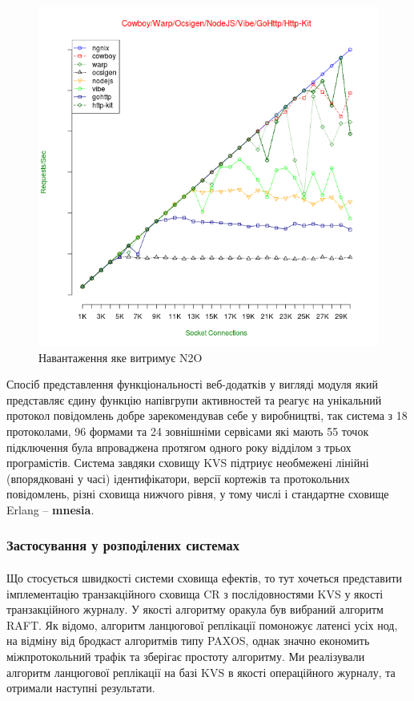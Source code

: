 \documentclass[11pt,oneside]{article}
\begin{document}
\begin{figure}[h!]
\centering
\includegraphics[scale=0.5]{img/connections}
\caption{Навантаження яке витримує N2O}
\end{figure}

Спосіб представлення функціональності веб-додатків у вигляді модуля який
представляє єдину функцію напівгрупи активностей та реагує на унікальний протокол повідомлень
добре зарекомендував себе у виробництві, так система з 18 протоколами,
96 формами та 24 зовнішніми сервісами які мають 55 точок підключення
була впроваджена протягом одного року відділом з трьох програмістів.
Система завдяки сховищу KVS підтриує необмежені лінійні (впорядковані у часі)
ідентифікатори, версії кортежів та протокольних повідомлень, різні сховища нижчого рівня,
у тому числі і стандартне сховище Erlang -- {\bf mnesia}.

\newpage
\subsubsection*{Застосування у розподілених системах}
\paragraph{}
Що стосується швидкості системи сховища ефектів, то тут хочеться представити
імплементацію транзакційного сховища CR\cite{renesse1} з послідовностями KVS
у якості транзакційного журналу. У якості алгоритму оракула був
вибраний алгоритм RAFT\cite{renesse2}. Як відомо, алгоритм ланцюгової реплікації
помоножує латенсі усіх нод, на відміну від бродкаст алгоритмів типу PAXOS,
однак значно економить міжпротокольний трафік та зберігає простоту алгоритму.
Ми реалізували алгоритм ланцюгової реплікації на базі KVS в якості операційного журналу,
та отримали наступні результати.
\end{document}
